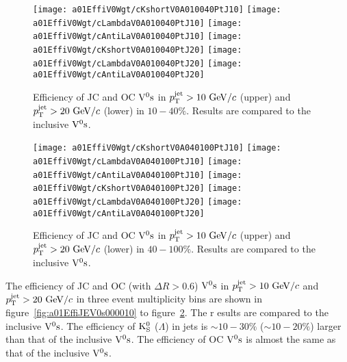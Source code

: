 \begin{figure}[htb]
\begin{center}
\texttt{[image: a01EffiV0Wgt/cKshortV0A010040PtJ10]}
\texttt{[image: a01EffiV0Wgt/cLambdaV0A010040PtJ10]}
\texttt{[image: a01EffiV0Wgt/cAntiLaV0A010040PtJ10]}
\texttt{[image: a01EffiV0Wgt/cKshortV0A010040PtJ20]}
\texttt{[image: a01EffiV0Wgt/cLambdaV0A010040PtJ20]}
\texttt{[image: a01EffiV0Wgt/cAntiLaV0A010040PtJ20]}
\caption{Efficiency of JC and OC ${\rm V}^{0}{\rm s}$ in $p_{\rm T}^{\rm jet}>10~{\rm GeV}/c$ (upper)
         and $p_{\rm T}^{\rm jet}>20~{\rm GeV}/c$ (lower) in $10-40\%$.
         Results are compared to the inclusive ${\rm V}^{0}{\rm s}$.}
\label{fig:a01EffiJEV0s010040}
\end{center}
\end{figure}

\begin{figure}[htb]
\begin{center}
\texttt{[image: a01EffiV0Wgt/cKshortV0A040100PtJ10]}
\texttt{[image: a01EffiV0Wgt/cLambdaV0A040100PtJ10]}
\texttt{[image: a01EffiV0Wgt/cAntiLaV0A040100PtJ10]}
\texttt{[image: a01EffiV0Wgt/cKshortV0A040100PtJ20]}
\texttt{[image: a01EffiV0Wgt/cLambdaV0A040100PtJ20]}
\texttt{[image: a01EffiV0Wgt/cAntiLaV0A040100PtJ20]}
\caption{Efficiency of JC and OC ${\rm V}^{0}{\rm s}$ in $p_{\rm T}^{\rm jet}>10~{\rm GeV}/c$ (upper)
         and $p_{\rm T}^{\rm jet}>20~{\rm GeV}/c$ (lower) in $40-100\%$.
         Results are compared to the inclusive ${\rm V}^{0}{\rm s}$.}
\label{fig:a01EffiJEV0s040100}
\end{center}
\end{figure}

The efficiency of JC and OC (with $\Delta R>0.6$) ${\rm V}^{0}{\rm s}$
in $p_{\rm T}^{\rm jet}>10~{\rm GeV}/c$ and $p_{\rm T}^{\rm jet}>20~{\rm GeV}/c$
in three event multiplicity bins
are shown in figure~\ref{fig:a01EffiJEV0s000010}
to figure~\ref{fig:a01EffiJEV0s040100}.
The r esults are compared to the inclusive ${\rm V}^{0}{\rm s}$.
The efficiency of ${\rm K}_{\rm S}^{0}$ ($\Lambda$) in jets is
$\sim 10-30\%$ ($\sim 10-20\%$) larger than that of the inclusive ${\rm V}^{0}{\rm s}$.
The efficiency of OC ${\rm V}^{0}{\rm s}$ is almost the same as that of
the inclusive ${\rm V}^{0}{\rm s}$.
